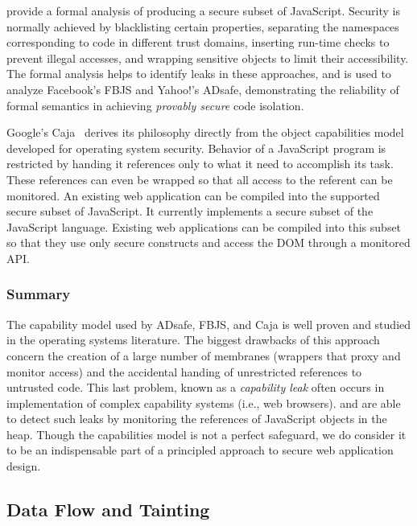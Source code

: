 \documentclass{acmtrans2m}
\begin{document}
 provide a formal analysis of producing a secure subset of JavaScript.
Security is normally achieved by blacklisting certain properties, separating the namespaces corresponding to code in different trust domains, inserting run-time checks to prevent illegal accesses, and wrapping sensitive objects to limit their accessibility.
The formal analysis helps to identify leaks in these approaches, and is used to analyze Facebook's FBJS and Yahoo!'s ADsafe, demonstrating the reliability of formal semantics in achieving \emph{provably secure} code isolation.

Google's Caja~\cite{caja} derives its philosophy directly from the object capabilities model developed for operating system security.
Behavior of a JavaScript program is restricted by handing it references only to what it need to accomplish its task.
These references can even be wrapped so that all access to the referent can be monitored.
An existing web application can be compiled into the supported secure subset of JavaScript.
It currently implements a secure subset of the JavaScript language.
Existing web applications can be compiled into this subset so that they use only secure constructs and access the DOM through a monitored API.

\subsubsection*{Summary}
The capability model used by ADsafe, FBJS, and Caja is well proven and studied in the operating systems literature.
The biggest drawbacks of this approach concern the creation of a large number of membranes (wrappers that proxy and monitor access) and the accidental handing of unrestricted references to untrusted code.
This last problem, known as a \emph{capability leak} often occurs in implementation of complex capability systems (i.e., web browsers).
 and  are able to detect such leaks by monitoring the references of JavaScript objects in the heap.
Though the capabilities model is not a perfect safeguard, we do consider it to be an indispensable part of a principled approach to secure web application design.

\subsection{Data Flow and Tainting}
\end{document}
